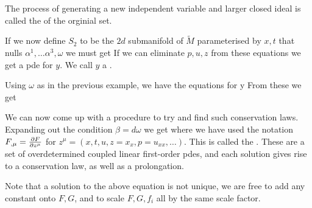 \documentclass{article}
\begin{document}
\begin{definition}
	The process of generating a new independent variable and larger closed ideal is called the  of the orginial set. 
\end{definition}  

If we now define $S_2$ to be the $2d$ submanifold of $\tilde{M}$ parameterised by $x,t$ that nulls $\alpha^1, \dots \alpha^3,\omega$ we must get 
If we can eliminate $p,u,z$ from these equations we get a pde for $y$. We call $y$ a .

\begin{example}
	Using $\omega$ as in the previous example, we have the equations for y
From these we get 
\end{example}

We can now come up with a procedure to try and find such conservation laws. Expanding out the condition $\beta=d\omega$ we get 
where we have used the notation $F_{,\mu} = \pd[F]{z^\mu}$ for $z^\mu = (x,t,u,z=x_x,p=u_{xx}, \dots)$. This is called the . These are a set of overdetermined coupled linear first-order pdes, and each solution gives rise to a conservation law, as well as a prolongation. 

\begin{remark}
	Note that a solution to the above equation is not unique, we are free to add any constant onto $F,G$, and to scale $F,G,f_i$ all by the same scale factor. 
\end{remark}
\end{document}
